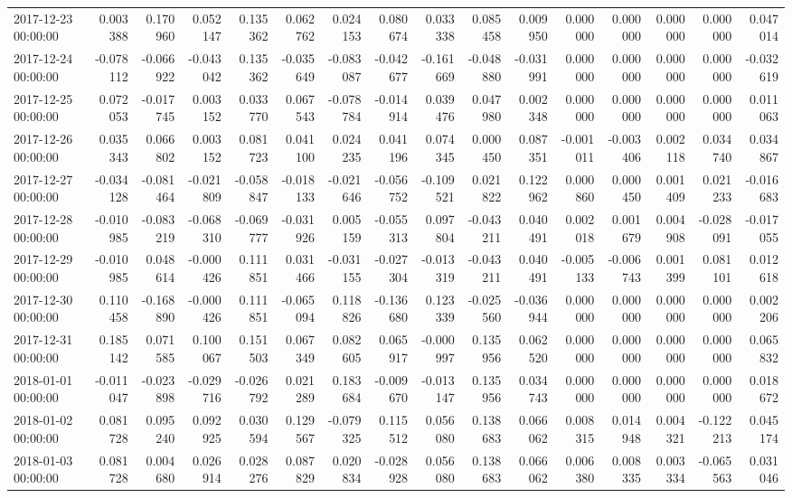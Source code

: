 \begin{tabular}{lrrrrrrrrrrrrrrr}
2017-12-23 00:00:00 & 0.003388 & 0.170960 & 0.052147 & 0.135362 & 0.062762 & 0.024153 & 0.080674 & 0.033338 & 0.085458 & 0.009950 & 0.000000 & 0.000000 & 0.000000 & 0.000000 & 0.047014 \\
2017-12-24 00:00:00 & -0.078112 & -0.066922 & -0.043042 & 0.135362 & -0.035649 & -0.083087 & -0.042677 & -0.161669 & -0.048880 & -0.031991 & 0.000000 & 0.000000 & 0.000000 & 0.000000 & -0.032619 \\
2017-12-25 00:00:00 & 0.072053 & -0.017745 & 0.003152 & 0.033770 & 0.067543 & -0.078784 & -0.014914 & 0.039476 & 0.047980 & 0.002348 & 0.000000 & 0.000000 & 0.000000 & 0.000000 & 0.011063 \\
2017-12-26 00:00:00 & 0.035343 & 0.066802 & 0.003152 & 0.081723 & 0.041100 & 0.024235 & 0.041196 & 0.074345 & 0.000450 & 0.087351 & -0.001011 & -0.003406 & 0.002118 & 0.034740 & 0.034867 \\
2017-12-27 00:00:00 & -0.034128 & -0.081464 & -0.021809 & -0.058847 & -0.018133 & -0.021646 & -0.056752 & -0.109521 & 0.021822 & 0.122962 & 0.000860 & 0.000450 & 0.001409 & 0.021233 & -0.016683 \\
2017-12-28 00:00:00 & -0.010985 & -0.083219 & -0.068310 & -0.069777 & -0.031926 & 0.005159 & -0.055313 & 0.097804 & -0.043211 & 0.040491 & 0.002018 & 0.001679 & 0.004908 & -0.028091 & -0.017055 \\
2017-12-29 00:00:00 & -0.010985 & 0.048614 & -0.000426 & 0.111851 & 0.031466 & -0.031155 & -0.027304 & -0.013319 & -0.043211 & 0.040491 & -0.005133 & -0.006743 & 0.001399 & 0.081101 & 0.012618 \\
2017-12-30 00:00:00 & 0.110458 & -0.168890 & -0.000426 & 0.111851 & -0.065094 & 0.118826 & -0.136680 & 0.123339 & -0.025560 & -0.036944 & 0.000000 & 0.000000 & 0.000000 & 0.000000 & 0.002206 \\
2017-12-31 00:00:00 & 0.185142 & 0.071585 & 0.100067 & 0.151503 & 0.067349 & 0.082605 & 0.065917 & -0.000997 & 0.135956 & 0.062520 & 0.000000 & 0.000000 & 0.000000 & 0.000000 & 0.065832 \\
2018-01-01 00:00:00 & -0.011047 & -0.023898 & -0.029716 & -0.026792 & 0.021289 & 0.183684 & -0.009670 & -0.013147 & 0.135956 & 0.034743 & 0.000000 & 0.000000 & 0.000000 & 0.000000 & 0.018672 \\
2018-01-02 00:00:00 & 0.081728 & 0.095240 & 0.092925 & 0.030594 & 0.129567 & -0.079325 & 0.115512 & 0.056080 & 0.138683 & 0.066062 & 0.008315 & 0.014948 & 0.004321 & -0.122213 & 0.045174 \\
2018-01-03 00:00:00 & 0.081728 & 0.004680 & 0.026914 & 0.028276 & 0.087829 & 0.020834 & -0.028928 & 0.056080 & 0.138683 & 0.066062 & 0.006380 & 0.008335 & 0.003334 & -0.065563 & 0.031046 \\

\end{tabular}
